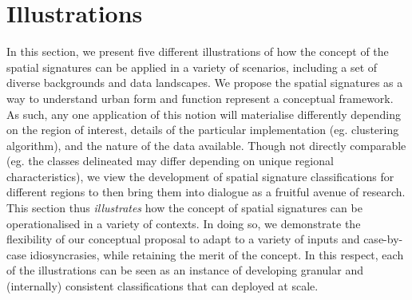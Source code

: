 \section{Illustrations}
\label{sec:app}



In this section, we present five different illustrations of how the concept of the spatial
signatures can be applied in a variety of scenarios, including a set of diverse
backgrounds and data landscapes.
We propose the spatial signatures as a way to understand urban form and function
represent a conceptual framework.
As such, any one application of this notion will materialise differently depending
on the region of interest, details of the particular implementation (eg. clustering algorithm),
and the nature of the data available.
%
Though not directly comparable (eg. the classes delineated may differ depending on unique
regional characteristics), we view the development of spatial signature classifications for
different regions to then bring them into dialogue as a fruitful avenue of research.
This section thus \textit{illustrates} how the concept of
spatial signatures can be operationalised in a variety of contexts.
In doing so, we demonstrate the flexibility of our conceptual proposal to adapt to
a variety of inputs and case-by-case idiosyncrasies, while retaining the merit of
the concept.
%
In this respect, each of the illustrations can be seen as an instance of developing
granular and (internally) consistent classifications that can deployed at scale.

